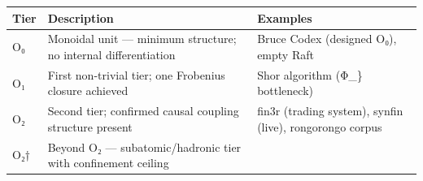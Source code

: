 \begin{longtable}[]{@{}lll@{}}
\toprule
\begin{minipage}[b]{0.20\columnwidth}\raggedright
Tier\strut
\end{minipage} & \begin{minipage}[b]{0.42\columnwidth}\raggedright
Description\strut
\end{minipage} & \begin{minipage}[b]{0.29\columnwidth}\raggedright
Examples\strut
\end{minipage}\tabularnewline
\midrule
\endhead
\begin{minipage}[t]{0.20\columnwidth}\raggedright
O₀\strut
\end{minipage} & \begin{minipage}[t]{0.42\columnwidth}\raggedright
Monoidal unit --- minimum structure; no internal differentiation\strut
\end{minipage} & \begin{minipage}[t]{0.29\columnwidth}\raggedright
Bruce Codex (designed O₀), empty Raft\strut
\end{minipage}\tabularnewline
\begin{minipage}[t]{0.20\columnwidth}\raggedright
O₁\strut
\end{minipage} & \begin{minipage}[t]{0.42\columnwidth}\raggedright
First non-trivial tier; one Frobenius closure achieved\strut
\end{minipage} & \begin{minipage}[t]{0.29\columnwidth}\raggedright
Shor algorithm (Φ\_\} bottleneck)\strut
\end{minipage}\tabularnewline
\begin{minipage}[t]{0.20\columnwidth}\raggedright
O₂\strut
\end{minipage} & \begin{minipage}[t]{0.42\columnwidth}\raggedright
Second tier; confirmed causal coupling structure present\strut
\end{minipage} & \begin{minipage}[t]{0.29\columnwidth}\raggedright
fin3r (trading system), synfin (live), rongorongo corpus\strut
\end{minipage}\tabularnewline
\begin{minipage}[t]{0.20\columnwidth}\raggedright
O₂†\strut
\end{minipage} & \begin{minipage}[t]{0.42\columnwidth}\raggedright
Beyond O₂ --- subatomic/hadronic tier with confinement ceiling\strut

\end{minipage}
\end{longtable}
